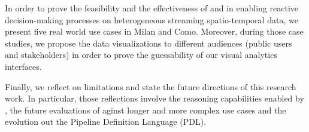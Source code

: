 In order to prove the feasibility and the effectiveness of \frappe{} and \river{} in enabling reactive decision-making processes on heterogeneous streaming spatio-temporal data, we present five real world use cases in Milan and Como.
Moreover, during those case studies, we propose the data visualizations to different audiences (public users and stakeholders) in order to prove the guessability of our visual analytics interfaces.

Finally, we reflect on limitations and state the future directions of this research work.
In particular, those reflections involve the reasoning capabilities enabled by \frappe{}, the future evaluations of \river{} aginst longer and more complex use cases and the evolution out the Pipeline Definition Language (PDL).



